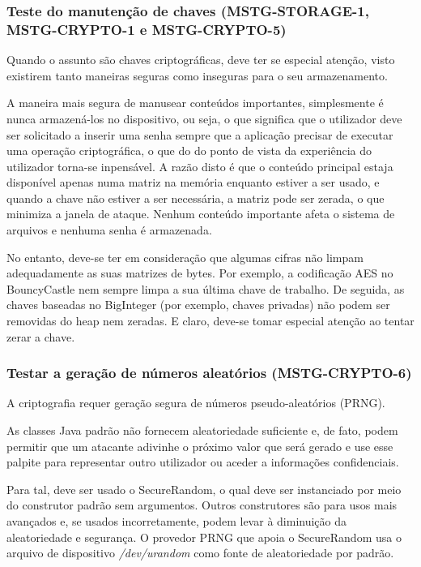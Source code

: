 \documentclass{article}
\begin{document}
\subsubsection{Teste do manutenção de chaves (MSTG-STORAGE-1, MSTG-CRYPTO-1 e MSTG-CRYPTO-5)}
\par Quando o assunto são chaves criptográficas, deve ter se especial atenção, visto existirem tanto maneiras seguras como inseguras para o seu armazenamento. 
\par A maneira mais segura de manusear conteúdos importantes, simplesmente é nunca armazená-los no dispositivo, ou seja, o que significa que o utilizador deve ser solicitado a inserir uma senha sempre que a aplicação precisar de executar uma operação criptográfica, o que do do ponto de vista da experiência do utilizador torna-se inpensável. A razão disto é que o conteúdo principal estaja disponível apenas numa matriz na memória enquanto estiver a ser usado, e quando a chave não estiver a ser necessária, a matriz pode ser zerada, o que minimiza a janela de ataque. Nenhum conteúdo importante afeta o sistema de arquivos e nenhuma senha é armazenada. 

\par No entanto, deve-se ter em consideração que algumas cifras não limpam adequadamente as suas matrizes de bytes. Por exemplo, a codificação AES no BouncyCastle nem sempre limpa a sua última chave de trabalho. De seguida, as chaves baseadas no BigInteger (por exemplo, chaves privadas) não podem ser removidas do heap nem zeradas. E claro, deve-se tomar especial atenção ao tentar zerar a chave. 



\subsubsection{Testar a geração de números aleatórios (MSTG-CRYPTO-6)}
\par A criptografia requer geração segura de números pseudo-aleatórios (PRNG).
\par As classes Java padrão não fornecem aleatoriedade suficiente e, de fato, podem permitir que um atacante adivinhe o próximo valor que será gerado e use esse palpite para representar outro utilizador ou aceder a informações confidenciais.

\par Para tal, deve ser usado o SecureRandom, o qual deve ser instanciado por meio do construtor padrão sem argumentos. Outros construtores são para usos mais avançados e, se usados incorretamente, podem levar à diminuição da aleatoriedade e segurança. O provedor PRNG que apoia o SecureRandom usa o arquivo de dispositivo \textit{/dev/urandom} como fonte de aleatoriedade por padrão.
\end{document}
